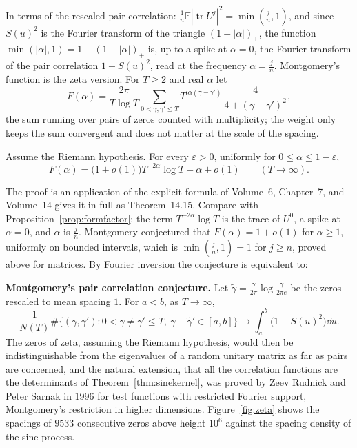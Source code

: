In terms of the rescaled pair correlation: $\frac1n\mathbb E|\operatorname{tr}U^j|^2=\min(\frac jn,1)$, and since $S(u)^2$ is the Fourier transform of the triangle $(1-|\alpha|)_+$, the function $\min(|\alpha|,1)=1-(1-|\alpha|)_+$ is, up to a spike at $\alpha=0$, the Fourier transform of the pair correlation $1-S(u)^2$, read at the frequency $\alpha=\frac jn$. Montgomery's
function is the zeta version. For $T\ge2$ and real $\alpha$ let
\[
F(\alpha)=\frac{2\pi}{T\log T}\sum_{0<\gamma,\gamma'\le T}T^{i\alpha(\gamma-\gamma')}\,\frac4{4+(\gamma-\gamma')^2},
\]
the sum running over pairs of zeros counted with multiplicity; the weight only keeps the sum convergent and does not matter at the scale of the spacing.

\begin{theorem}\label{thm:montgomery}
Assume the Riemann hypothesis. For every $\varepsilon>0$, uniformly for $0\le\alpha\le1-\varepsilon$,
\[
F(\alpha)=\bigl(1+o(1)\bigr)T^{-2\alpha}\log T+\alpha+o(1)\qquad(T\to\infty).
\]
\end{theorem}

The proof is an application of the explicit formula of Volume~6, Chapter~7, and Volume~14 gives it in full as Theorem~14.15. Compare with Proposition~\ref{prop:formfactor}: the term $T^{-2\alpha}\log T$ is the trace of $U^0$, a spike at $\alpha=0$, and $\alpha$ is
$\frac jn$. Montgomery conjectured that $F(\alpha)=1+o(1)$ for $\alpha\ge1$, uniformly on bounded intervals, which is $\min(\frac jn,1)=1$ for $j\ge n$, proved above for matrices. By Fourier inversion the conjecture is equivalent to:

\begin{beauty}
\textbf{Montgomery's pair correlation conjecture.} Let $\tilde\gamma=\frac\gamma{2\pi}\log\frac\gamma{2\pi e}$ be the zeros rescaled to mean spacing $1$. For $a<b$, as $T\to\infty$,
\[
\frac1{N(T)}\#\bigl\{(\gamma,\gamma'):0<\gamma\ne\gamma'\le T,\ \tilde\gamma-\tilde\gamma'\in[a,b]\bigr\}\longrightarrow\int_a^b\bigl(1-S(u)^2\bigr)\dd u.
\]
The zeros of zeta, assuming the Riemann hypothesis, would then be indistinguishable from the eigenvalues of a random unitary matrix as far as pairs are concerned, and the natural extension, that all the correlation functions
are the determinants of Theorem~\ref{thm:sinekernel}, was proved by Zeev Rudnick and Peter Sarnak in 1996 for test functions with restricted Fourier support, Montgomery's restriction in higher dimensions. Figure~\ref{fig:zeta}
shows the spacings of $9533$ consecutive zeros above height $10^6$ against the spacing density of the sine process.
\end{beauty}

